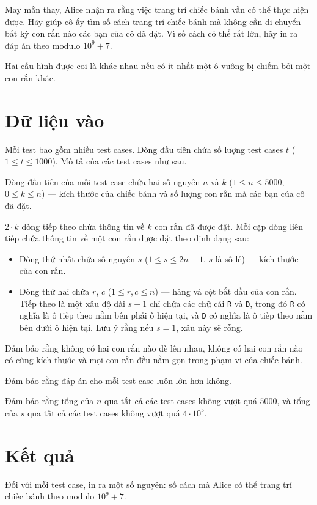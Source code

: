 \documentclass[11pt]{article}
\begin{document}
May mắn thay, Alice nhận ra rằng việc trang trí chiếc bánh vẫn có thể thực hiện được. Hãy giúp cô ấy tìm số cách trang trí chiếc bánh mà không cần di chuyển bất kỳ con rắn nào các bạn của cô đã đặt. Vì số cách có thể rất lớn, hãy in ra đáp án theo modulo $10^9 + 7$.

Hai cấu hình được coi là khác nhau nếu có ít nhất một ô vuông bị chiếm bởi một con rắn khác.

\section*{Dữ liệu vào}
Mỗi test bao gồm nhiều test cases. Dòng đầu tiên chứa số lượng test cases $t$ ($1 \le t \le 1000$). Mô tả của các test cases như sau.

Dòng đầu tiên của mỗi test case chứa hai số nguyên $n$ và $k$ ($1 \le n \le 5000$, $0 \le k \le n$) — kích thước của chiếc bánh và số lượng con rắn mà các bạn của cô đã đặt.

$2 \cdot k$ dòng tiếp theo chứa thông tin về $k$ con rắn đã được đặt. Mỗi cặp dòng liên tiếp chứa thông tin về một con rắn được đặt theo định dạng sau:
\begin{itemize}
    \item Dòng thứ nhất chứa số nguyên $s$ ($1 \le s \le 2n-1$, $s$ là số lẻ) — kích thước của con rắn.
    \item Dòng thứ hai chứa $r$, $c$ ($1 \le r, c \le n$) — hàng và cột bắt đầu của con rắn. Tiếp theo là một xâu độ dài $s-1$ chỉ chứa các chữ cái \texttt{R} và \texttt{D}, trong đó \texttt{R} có nghĩa là ô tiếp theo nằm bên phải ô hiện tại, và \texttt{D} có nghĩa là ô tiếp theo nằm bên dưới ô hiện tại. Lưu ý rằng nếu $s = 1$, xâu này sẽ rỗng.
\end{itemize}

Đảm bảo rằng không có hai con rắn nào đè lên nhau, không có hai con rắn nào có cùng kích thước và mọi con rắn đều nằm gọn trong phạm vi của chiếc bánh.

Đảm bảo rằng đáp án cho mỗi test case luôn lớn hơn không.

Đảm bảo rằng tổng của $n$ qua tất cả các test cases không vượt quá $5000$, và tổng của $s$ qua tất cả các test cases không vượt quá $4 \cdot 10^5$.

\section*{Kết quả}
Đối với mỗi test case, in ra một số nguyên: số cách mà Alice có thể trang trí chiếc bánh theo modulo $10^9 + 7$.
\end{document}
